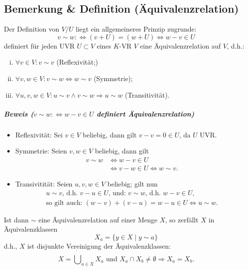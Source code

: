 \subsection{Bemerkung \& Definition (Äquivalenzrelation)}
	\begin{Definition}[Äquivalenzrelation]
		Der Definition von $ V/U $ liegt ein allgemeineres Prinzip zugrunde:	
		\[ v\sim w :\Leftrightarrow (v+U)= (w+U) \Leftrightarrow w-v \in U \]
	definiert für jeden UVR $ U\subset V $ eines $ K $-VR $ V $ eine Äquivalenzrelation auf $ V $, d.h.:
		\begin{enumerate}[(i)]
			\item $ \forall v\in V: v\sim v $ (Reflexivität;)
			\item $ \forall v,w\in V: v\sim w\Leftrightarrow w\sim v $ (Symmetrie);
			\item $ \forall u,v,w\in V: u\sim v\land v\sim w\Rightarrow u\sim w $ (Transitivität).
		\end{enumerate}
	\end{Definition}

\subparagraph{Beweis ($ v\sim w:\Leftrightarrow w-v\in U $ definiert Äquivalenzrelation)}
	
	\begin{itemize}
		\item Reflexivität: Sei $ v\in V $ beliebig, dann gilt $ v-v=0\in U $, da $ U $ UVR.
		\item Symmetrie: Seien $ v,w\in V $ beliebig, dann gilt
			\begin{align*}
			v\sim w 	&\Leftrightarrow w-v\in U\\
						&\Leftrightarrow v-w\in U \Leftrightarrow w\sim v.
			\end{align*}
		\item Transivitität: Seien $ u,v,w\in V $ beliebig; gilt nun
			\begin{gather*}
			u\sim v \text{, d.h. } v-u\in U \text{, und: } v\sim w\text{, d.h. } w-v\in U,\\
			\text{so gilt auch: }(w-v)+(v-u)= w-u\in U \Leftrightarrow u\sim w.
			\end{gather*}
	\end{itemize}
	
	Ist dann $ \sim $ eine Äquivalenzrelation auf einer Menge $ X $, so zerfällt $ X $ in Äquivalenzklassen
		\[ X_a = \{y\in X\mid y\sim a\} \]
	d.h., $ X $ ist disjunkte Vereinigung der Äquivalenzklassen:
		\[ X = \dot{\bigcup}_{a\in X}X_a \text{ und } X_a \cap X_b \neq \emptyset \Rightarrow X_a = X_b. \]
		
